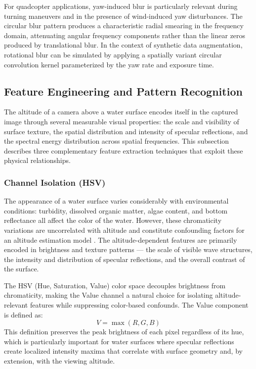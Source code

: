     For quadcopter applications, yaw-induced blur is particularly relevant during turning maneuvers and in the presence of wind-induced yaw disturbances. The circular blur pattern produces a characteristic radial smearing in the frequency domain, attenuating angular frequency components rather than the linear zeros produced by translational blur. In the context of synthetic data augmentation, rotational blur can be simulated by applying a spatially variant circular convolution kernel parameterized by the yaw rate and exposure time.

\subsection{Feature Engineering and Pattern Recognition}

The altitude of a camera above a water surface encodes itself in the captured image through several measurable visual properties: the scale and visibility of surface texture, the spatial distribution and intensity of specular reflections, and the spectral energy distribution across spatial frequencies. This subsection describes three complementary feature extraction techniques that exploit these physical relationships.

    \subsubsection{Channel Isolation (HSV)}

    The appearance of a water surface varies considerably with environmental conditions: turbidity, dissolved organic matter, algae content, and bottom reflectance all affect the color of the water. However, these chromaticity variations are uncorrelated with altitude and constitute confounding factors for an altitude estimation model \cite{ColorTurb, Pekel2016}. The altitude-dependent features are primarily encoded in brightness and texture patterns --- the scale of visible wave structures, the intensity and distribution of specular reflections, and the overall contrast of the surface.

    The HSV (Hue, Saturation, Value) color space decouples brightness from chromaticity, making the Value channel a natural choice for isolating altitude-relevant features while suppressing color-based confounds. The Value component is defined as:
    \begin{equation}
        V = \max(R, G, B)
        \label{eq:hsv_value}
    \end{equation}
    This definition preserves the peak brightness of each pixel regardless of its hue, which is particularly important for water surfaces where specular reflections create localized intensity maxima that correlate with surface geometry and, by extension, with the viewing altitude.

